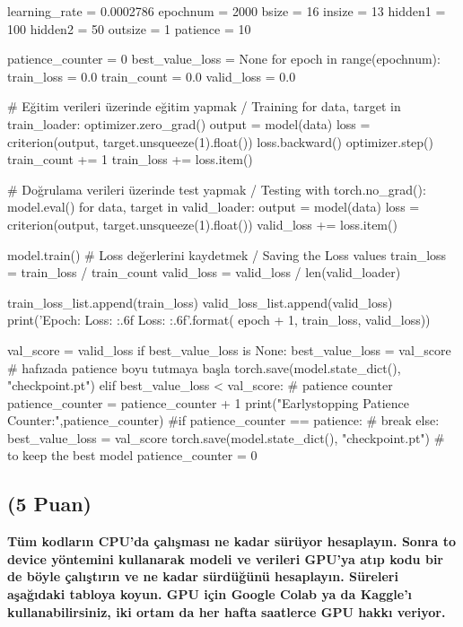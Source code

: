 \documentclass[11pt]{article}
\begin{document}
\begin{python}

learning_rate = 0.0002786
epochnum = 2000
bsize = 16
insize = 13
hidden1 = 100
hidden2 = 50
outsize = 1
patience = 10

patience_counter = 0
best_value_loss = None
for epoch in range(epochnum):
    train_loss = 0.0
    train_count = 0.0
    valid_loss = 0.0

    # Eğitim verileri üzerinde eğitim yapmak / Training
    for data, target in train_loader:
        optimizer.zero_grad()
        output = model(data)
        loss = criterion(output, target.unsqueeze(1).float())
        loss.backward()
        optimizer.step()
        train_count += 1
        train_loss += loss.item()

    # Doğrulama verileri üzerinde test yapmak / Testing
    with torch.no_grad():
        model.eval()
        for data, target in valid_loader:
            output = model(data)
            loss = criterion(output, target.unsqueeze(1).float())
            valid_loss += loss.item()
    
    model.train()
    # Loss değerlerini kaydetmek / Saving the Loss values
    train_loss = train_loss / train_count
    valid_loss = valid_loss / len(valid_loader)
        
    train_loss_list.append(train_loss)
    valid_loss_list.append(valid_loss)
    print('Epoch: {} \tTraining Loss: {:.6f} \tValidation Loss: {:.6f}'.format(
        epoch + 1, train_loss, valid_loss))
    
    val_score = valid_loss
    if best_value_loss is None:
        best_value_loss = val_score # hafızada patience boyu tutmaya başla
        torch.save(model.state_dict(), "checkpoint.pt")
    elif best_value_loss < val_score: # patience counter
        patience_counter = patience_counter + 1
        print("Earlystopping Patience Counter:",patience_counter)
        #if patience_counter == patience:
        #    break
    else:
        best_value_loss = val_score
        torch.save(model.state_dict(), "checkpoint.pt") # to keep the best model
        patience_counter = 0
\end{python}

\subsection{(5 Puan)} \textbf{Tüm kodların CPU'da çalışması ne kadar sürüyor hesaplayın. Sonra to device yöntemini kullanarak modeli ve verileri GPU'ya atıp kodu bir de böyle çalıştırın ve ne kadar sürdüğünü hesaplayın. Süreleri aşağıdaki tabloya koyun. GPU için Google Colab ya da Kaggle'ı kullanabilirsiniz, iki ortam da her hafta saatlerce GPU hakkı veriyor.}
\end{document}

